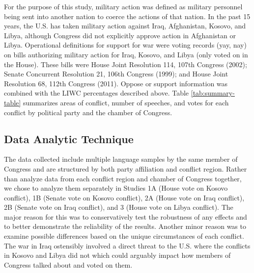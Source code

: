 \documentclass[jou,a4paper]{apa6}
\begin{document}
For the purpose of this study, military action was defined as military personnel being sent into another nation to coerce the actions of that nation. In the past 15 years, the U.S. has taken military action against Iraq, Afghanistan, Kosovo, and Libya, although Congress did not explicitly approve action in Afghanistan or Libya. Operational definitions for support for war were voting records (yay, nay) on bills authorizing military action for Iraq, Kosovo, and Libya (only voted on in the House). These bills were House Joint Resolution 114, 107th Congress (2002); Senate Concurrent Resolution 21, 106th Congress (1999); and House Joint Resolution 68, 112th Congress (2011). Oppose or support information was combined with the LIWC percentages described above. Table \ref{tab:summary-table} summarizes areas of conflict, number of speeches, and votes for each conflict by political party and the chamber of Congress.

\subsection{Data Analytic Technique}

The data collected include multiple language samples by the same member of Congress and are structured by both party affiliation and conflict region. Rather than analyze data from each conflict region and chamber of Congress together, we chose to analyze them separately in Studies 1A (House vote on Kosovo conflict), 1B (Senate vote on Kosovo conflict), 2A (House vote on Iraq conflict), 2B (Senate vote on Iraq conflict), and 3 (House vote on Libya conflict). The major reason for this was to conservatively test the robustness of any effects and to better demonstrate the reliability of the results. Another minor reason was to examine possible differences based on the unique circumstances of each conflict. The war in Iraq ostensibly involved a direct threat to the U.S. where the conflicts in Kosovo and Libya did not which could arguably impact how members of Congress talked about and voted on them.
\end{document}

